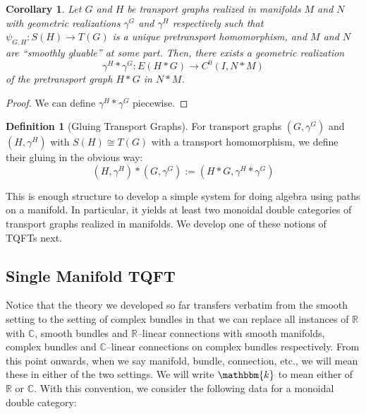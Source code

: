 \documentclass{amsart}
\newcommand{\R}{\mathbb{R}}
\newcommand{\C}{\mathbb{C}}
\newcommand{\K}{\mathbbm{k}}
\renewcommand{\to}[1][]{\stackrel{#1}{\longrightarrow}}
\numberwithin{thm}{section}
\newtheorem{cor}[thm]{Corollary}
\theoremstyle{definition}
\newtheorem{defn}[thm]{Definition}
\begin{document}
\begin{cor}
Let $G$ and $H$ be transport graphs realized in manifolds
$M$ and $N$ with geometric realizations $\gamma^G$ and
$\gamma^H$ respectively such that $\psi_{G, H} : S(H) \to T(G)$ is a unique
pretransport homomorphism, and $M$ and $N$ are ``smoothly gluable'' at some
part. Then, there exists a geometric realization
\[
  \gamma^H * \gamma^G : E(H * G) \to C^0(I, N * M)
\]
of the pretransport graph $H * G$ in $N * M$.
\end{cor}
\begin{proof}
We can define $\gamma^H * \gamma^G$ piecewise.
\end{proof}

\begin{defn}[Gluing Transport Graphs]
For transport graphs $(G, \gamma^G)$ and $(H, \gamma^H)$ with $S(H) \cong T(G)$
with a transport homomorphism, we define their gluing in the obvious way:
\[
  (H, \gamma^H) * (G, \gamma^G) := (H * G, \gamma^H * \gamma^G)
\]
\end{defn}

This is enough structure to develop a simple system for doing algebra using
paths on a manifold. In particular, it yields at least two monoidal double
categories of transport graphs realized in manifolds. We develop one of these
notions of TQFTs next.

%

\subsection{Single Manifold TQFT}\label{subsec:sing_man_tqft}

Notice that the theory we developed so far transfers verbatim from the smooth
setting to the setting of complex bundles in that we can replace all instances
of $\R$ with $\C$, smooth bundles and $\R$--linear connections with smooth
manifolds, complex bundles and $\C$--linear connections on complex bundles
respectively. From this point onwards, when we say manifold, bundle, connection,
etc., we will mean these in either of the two settings. We will write $\K$ to
mean either of $\R$ or $\C$. With this convention, we consider the following
data for a monoidal double category:
\end{document}
